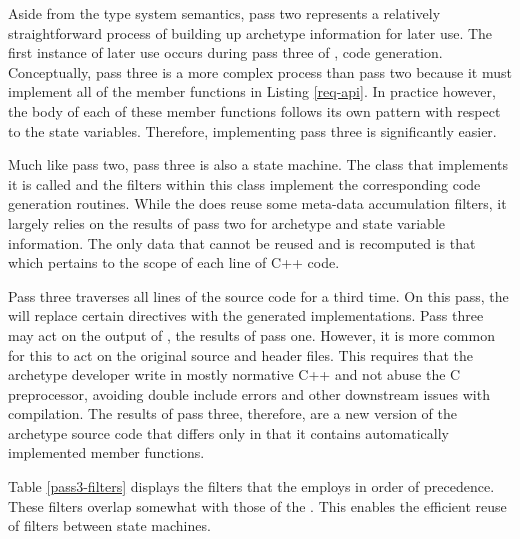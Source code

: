 Aside from the type system semantics, pass two represents a relatively straightforward
process of building up archetype information for later use. The first instance
of later use occurs during pass three of \cycpp,
code generation.  Conceptually, 
pass three is a more complex process than pass two because it must implement 
all of the member functions in Listing \ref{req-api}. In practice however, the body 
of each of these member functions follows its own pattern with respect to the 
state variables. Therefore, implementing pass three is significantly easier.

Much like pass two, pass three is also a state machine. The class that implements it is 
called  and the filters within this class implement 
the corresponding code generation routines.  While the   does 
reuse some meta-data accumulation filters, it largely relies on the results of 
pass two for archetype and state variable information.  The only data that cannot be 
reused and is recomputed is that which pertains to the scope of each line of C++ code.

Pass three traverses all lines of the source code for a third time.
On this pass, the  will replace certain 
directives with the generated implementations.  Pass three may act on the output of
, the results of pass one.  However, it is more common for this 
to act on the original source and header files.  This requires that the 
archetype developer write in mostly normative C++ and not abuse the C
preprocessor,
avoiding double include errors and other downstream issues with 
compilation. The results of pass three, therefore, are a new version of the archetype
source code that differs only in that it contains automatically implemented 
member functions.

Table \ref{pass3-filters} displays the filters that the  
employs in order of precedence. These filters overlap somewhat with
those of the . This enables the efficient reuse
of filters between state machines.

